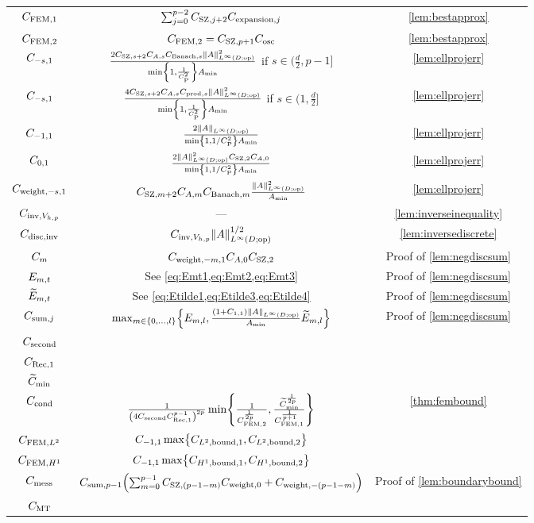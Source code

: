 \begin{longtabu}{ccc}
  $C_{\mathrm{FEM},1}$ & $\sum_{j=0}^{p-2}C_{\mathrm{SZ},j+2}C_{\mathrm{expansion},j} $ & \cref{lem:bestapprox}\\
  $C_{\mathrm{FEM},2}$ & $C_{\mathrm{FEM},2} = C_{\mathrm{SZ},p+1}C_{\mathrm{osc}}$ & \cref{lem:bestapprox}\\
  $C_{-s,1}$ &$\frac{2\CSZfn{s+2}\CAfn{s}\CBanfn{s}\NLiDop{A}^2}{\min\set{1,\frac1{\CP^2}}\Amin}$ if $s \in (\frac{d}2,p-1]$& \cref{lem:ellprojerr} \\
  $C_{-s,1}$ &$\frac{4\CSZfn{s+2}\CAfn{s}\Cprod{s}\NLiDop{A}^2}{\min\set{1,\frac1{\CP^2}}\Amin}$ if $s \in (1,\frac{d}2]$& \cref{lem:ellprojerr} \\
  $C_{-1,1}$ &$\frac{2\NLiDop{A}}{\min\set{1,1/\CP^2}\Amin}$& \cref{lem:ellprojerr} \\
  $C_{0,1}$ &$\frac{2\NLiDop{A}^2\CSZfn{2}\CAfn{0}}{\min\set{1,1/\CP^2}\Amin}$& \cref{lem:ellprojerr} \\
  $C_{\mathrm{weight},-s,1}$ &$\CSZfn{m+2}\CAfn{m}\CBanfn{m}\frac{\NLiDop{A}^2}{\Amin}$& \cref{lem:ellprojerr} \\
  $C_{\mathrm{inv},V_{h,p}}$ &---& \cref{lem:inverseinequality}\\
  $C_{\mathrm{disc},\mathrm{inv}}$ & $\CinvVhp \NLiDop{A}^{1/2}$ & \cref{lem:inversediscrete}\\
  $C_{m}$ & $C_{\mathrm{weight},-m,1}  C_{A,0} C_{\mathrm{SZ},2}$ & Proof of \cref{lem:negdiscsum}\\
  $E_{m,t}$ & See \cref{eq:Emt1,eq:Emt2,eq:Emt3} & Proof of \cref{lem:negdiscsum}\\
  $\widetilde{E}_{m,t}$ & See \cref{eq:Etilde1,eq:Etilde3,eq:Etilde4} & Proof of \cref{lem:negdiscsum}\\
  $C_{\mathrm{sum},j}$ &$\max_{m \in \set{0,\ldots,l}}\set{\Efn{m,l},\frac{\mleft(1+\Cfn{1,1}\mright)\NLiDop{A}}{\Amin}\Etildefn{m,l}}$ & Proof of \cref{lem:negdiscsum}\\
  $C_{\mathrm{second}}$ &&\\
  $C_{\mathrm{Rec},1}$&&\\
  $\widetilde{C}_{\min}$&&\\
  $C_{\mathrm{cond}}$ & $\frac1{\mleft(4\Csecond \CReco^{p-1}\mright)^{2p}} \min\set{\frac1{\CFEMttilde^{\frac1{2p}}},\frac{\Ctildemin^{\frac1{2p}}}{\CFEMotilde^{\frac1{p+1}}}}$ & \cref{thm:fembound}\\
  $C_{\mathrm{FEM},L^{2}}$ &$\Cfn{-1,1} \max\set{\CLtboundo,\CLtboundt}$&\\
  $C_{\mathrm{FEM},H^{1}}$ &$\Cfn{-1,1}\max\set{\CHoboundo,\CHoboundt}$&\\
  $C_{\mathrm{mess}}$ &$\Csumpmo \mleft(\sum_{m=0}^{p-1} \CSZfn{(p-1-m)} \Cwfn{0} + \Cwfn{-(p-1-m)}\mright)$&Proof of \cref{lem:boundarybound}\\
  $C_{\mathrm{MT}}$ &&\\

\end{longtabu}
